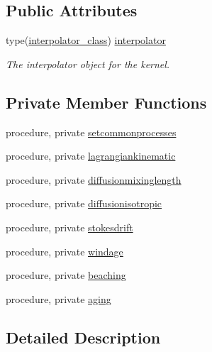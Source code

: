 \subsection*{Public Attributes}
\begin{DoxyCompactItemize}
\item 
type(\mbox{\hyperlink{structinterpolator__mod_1_1interpolator__class}{interpolator\+\_\+class}}) \mbox{\hyperlink{structkernel__mod_1_1kernel__class_a9ad0ab75e7c6a0eff5e24d9d5cd3a72d}{interpolator}}
\begin{DoxyCompactList}\small\item\em The interpolator object for the kernel. \end{DoxyCompactList}\end{DoxyCompactItemize}
\subsection*{Private Member Functions}
\begin{DoxyCompactItemize}
\item 
procedure, private \mbox{\hyperlink{structkernel__mod_1_1kernel__class_a45e76f467fa1c842416d4daf722d92ae}{setcommonprocesses}}
\item 
procedure, private \mbox{\hyperlink{structkernel__mod_1_1kernel__class_a955d89ed307afca4483f2ac06c03d8f6}{lagrangiankinematic}}
\item 
procedure, private \mbox{\hyperlink{structkernel__mod_1_1kernel__class_a1ba4a72f6cfb6f6d9462d89714d035d5}{diffusionmixinglength}}
\item 
procedure, private \mbox{\hyperlink{structkernel__mod_1_1kernel__class_ade7a7d02085be709e7867735294e82a9}{diffusionisotropic}}
\item 
procedure, private \mbox{\hyperlink{structkernel__mod_1_1kernel__class_ae728ca6b395be36077c1d3d51f36cf25}{stokesdrift}}
\item 
procedure, private \mbox{\hyperlink{structkernel__mod_1_1kernel__class_a3505f9e73946acb3d427023cd542f39e}{windage}}
\item 
procedure, private \mbox{\hyperlink{structkernel__mod_1_1kernel__class_a8fb79882cea4947812f75cb3e39c9617}{beaching}}
\item 
procedure, private \mbox{\hyperlink{structkernel__mod_1_1kernel__class_a7366a75fd76c37804607b466cf4f0212}{aging}}
\end{DoxyCompactItemize}


\subsection{Detailed Description}


